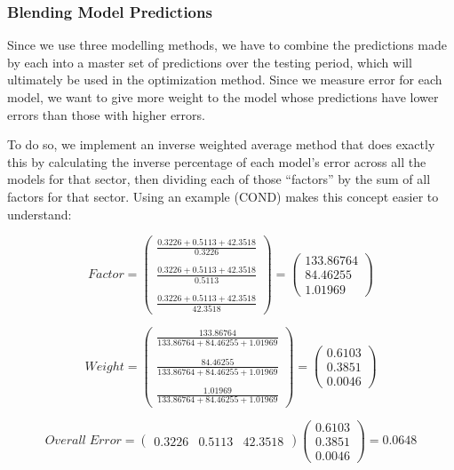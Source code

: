 \documentclass[]{article}
\begin{document}
\hypertarget{blending-model-predictions}{%
\subsubsection{Blending Model
Predictions}\label{blending-model-predictions}}

Since we use three modelling methods, we have to combine the predictions
made by each into a master set of predictions over the testing period,
which will ultimately be used in the optimization method. Since we
measure error for each model, we want to give more weight to the model
whose predictions have lower errors than those with higher errors.

To do so, we implement an inverse weighted average method that does
exactly this by calculating the inverse percentage of each model's error
across all the models for that sector, then dividing each of those
``factors'' by the sum of all factors for that sector. Using an example
(COND) makes this concept easier to understand:

\[
Factor=\begin{pmatrix}
\frac{0.3226+0.5113+42.3518}{0.3226} \\
\\
\frac{0.3226+0.5113+42.3518}{0.5113} \\
\\
\frac{0.3226+0.5113+42.3518}{42.3518}
\end{pmatrix} =
\begin{pmatrix}
133.86764  \\
84.46255 \\
1.01969
\end{pmatrix}
\]

\[
Weight=\begin{pmatrix}
\frac{133.86764}{133.86764+84.46255+1.01969} \\
\\
\frac{84.46255}{133.86764+84.46255+1.01969} \\
\\
\frac{1.01969}{133.86764+84.46255+1.01969}
\end{pmatrix}=
\begin{pmatrix}
0.6103  \\
0.3851 \\
0.0046
\end{pmatrix}
\]

\[
Overall\;Error=\begin{pmatrix}0.3226 & 0.5113 & 42.3518\end{pmatrix}
\begin{pmatrix}0.6103 \\ 0.3851 \\ 0.0046\end{pmatrix}
= 0.0648
\]
\end{document}

